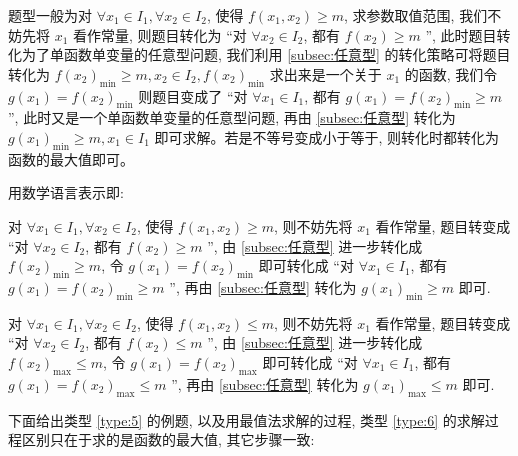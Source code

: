 题型一般为对 \(\forall {x}_{1} \in  {I}_{1}, \forall {x}_{2} \in  {I}_{2}\), 使得 \(f(x_1, x_2)  \geq  m\), 求参数取值范围, 我们不妨先将 \({x}_{1}\) 看作常量, 则题目转化为 “对 \(\forall {x}_{2} \in  {I}_{2}\), 都有 \(f\left( {x}_{2}\right)  \geq  m\) ”, 此时题目转化为了单函数单变量的任意型问题, 我们利用 \ref{subsec:任意型} 的转化策略可将题目转化为 \(f{\left( {x}_{2}\right) }_{\min } \geq  m, {x}_{2} \in  {I}_{2}, f{\left( {x}_{2}\right) }_{\min }\) 求出来是一个关于 \({x}_{1}\) 的函数, 我们令 \(g\left( {x}_{1}\right)  = f{\left( {x}_{2}\right) }_{\min }\) 则题目变成了 “对 \(\forall {x}_{1} \in  {I}_{1}\), 都有 \(g\left( {x}_{1}\right)  = f{\left( {x}_{2}\right) }_{\min } \geq  m\) ”, 此时又是一个单函数单变量的任意型问题, 再由 \ref{subsec:任意型} 转化为 \(g{\left( {x}_{1}\right) }_{\min } \geq  m, {x}_{1} \in  {I}_{1}\) 即可求解。若是不等号变成小于等于, 则转化时都转化为函数的最大值即可。

用数学语言表示即:

\begin{type}\label{type:5}
  对 \(\forall {x}_{1} \in  {I}_{1}, \forall {x}_{2} \in  {I}_{2}\), 使得 \(f(x_1, x_2)  \geq  m\), 则不妨先将 \({x}_{1}\) 看作常量, 题目转变成 “对 \(\forall {x}_{2} \in  {I}_{2}\), 都有 \(f\left( {x}_{2}\right)  \geq  m\) ”, 由 \ref{subsec:任意型} 进一步转化成 \(f{\left( {x}_{2}\right) }_{\min } \geq  m\), 令 \(g\left( {x}_{1}\right)  = f{\left( {x}_{2}\right) }_{\min }\) 即可转化成 “对 \(\forall {x}_{1} \in  {I}_{1}\), 都有 \(g\left( {x}_{1}\right)  = f{\left( {x}_{2}\right) }_{\min } \geq  m\) ”, 再由 \ref{subsec:任意型} 转化为 \(g{\left( {x}_{1}\right) }_{\min } \geq  m\) 即可.
\end{type}

\begin{type}\label{type:6}
  对 \(\forall {x}_{1} \in  {I}_{1}, \forall {x}_{2} \in  {I}_{2}\), 使得 \(f(x_1, x_2)  \leq  m\), 则不妨先将 \({x}_{1}\) 看作常量, 题目转变成 “对 \(\forall {x}_{2} \in  {I}_{2}\), 都有 \(f\left( {x}_{2}\right)  \leq  m\) ”, 由 \ref{subsec:任意型} 进一步转化成 \(f{\left( {x}_{2}\right) }_{\max } \leq  m\), 令 \(g\left( {x}_{1}\right)  = f{\left( {x}_{2}\right) }_{\max }\) 即可转化成 “对 \(\forall {x}_{1} \in  {I}_{1}\), 都有 \(g\left( {x}_{1}\right)  = f{\left( {x}_{2}\right) }_{\max } \leq  m\) ”, 再由 \ref{subsec:任意型} 转化为 \(g{\left( {x}_{1}\right) }_{\max } \leq  m\) 即可.
\end{type}

下面给出类型 \ref{type:5} 的例题, 以及用最值法求解的过程, 类型 \ref{type:6} 的求解过程区别只在于求的是函数的最大值, 其它步骤一致:

